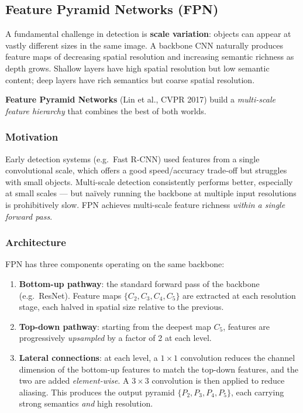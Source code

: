 \documentclass[11pt,a4paper]{article}
\newcommand{\term}[1]{\textcolor{DefGreen}{\textbf{#1}}}
\begin{document}
\subsection{Feature Pyramid Networks (FPN)}
\label{sec:fpn}

A fundamental challenge in detection is \term{scale variation}: objects can appear at vastly different sizes in the same image. A backbone CNN naturally produces feature maps of decreasing spatial resolution and increasing semantic richness as depth grows. Shallow layers have high spatial resolution but low semantic content; deep layers have rich semantics but coarse spatial resolution.

\term{Feature Pyramid Networks} (Lin et al., CVPR 2017) build a \emph{multi-scale feature hierarchy} that combines the best of both worlds.

\subsubsection{Motivation}

Early detection systems (e.g.\ Fast R-CNN) used features from a single convolutional scale, which offers a good speed/accuracy trade-off but struggles with small objects. Multi-scale detection consistently performs better, especially at small scales — but naïvely running the backbone at multiple input resolutions is prohibitively slow. FPN achieves multi-scale feature richness \emph{within a single forward pass}.

\subsubsection{Architecture}

FPN has three components operating on the same backbone:

\begin{enumerate}
  \item \textbf{Bottom-up pathway}: the standard forward pass of the backbone (e.g.\ ResNet). Feature maps $\{C_2, C_3, C_4, C_5\}$ are extracted at each resolution stage, each halved in spatial size relative to the previous.
  \item \textbf{Top-down pathway}: starting from the deepest map $C_5$, features are progressively \emph{upsampled} by a factor of 2 at each level.
  \item \textbf{Lateral connections}: at each level, a $1 \times 1$ convolution reduces the channel dimension of the bottom-up features to match the top-down features, and the two are added \emph{element-wise}. A $3 \times 3$ convolution is then applied to reduce aliasing. This produces the output pyramid $\{P_2, P_3, P_4, P_5\}$, each carrying strong semantics \emph{and} high resolution.
\end{enumerate}
\end{document}
